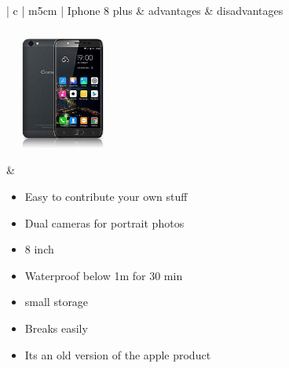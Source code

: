 \documentclass{article}
\begin{document}
\begin{table}[h!]
	\centering
	\begin{tabular}{ | c | m{5cm} |  }
		\hline
	Iphone 8 plus & advantages & disadvantages \\ \hline
		\begin{minipage}{.4\textwidth}
		
		\includegraphics[width= \linewidth, height=40mm]{smartphone}
	\end{minipage}
		&
		\begin{itemize}
		   \item Easy to contribute your own stuff
		   \item Dual cameras for portrait photos
		   \item 8 inch
		   \item Waterproof below 1m for 30 min
		\end{itemize}
	\begin{itemize}
		\item small storage
		\item Breaks easily
		\item Its an old version of the apple product
	\end{itemize}
\\ \hline
	\end{tabular}
 \caption{Iphone 8 plus analysis}\label{tbl:Iphone 8 plus}
\end{table}
	
\end{document}
